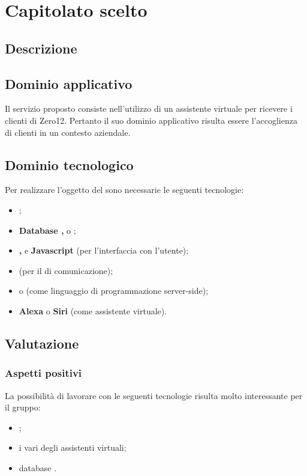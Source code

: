 \section {Capitolato scelto}
	\subsection {Descrizione}
		\SCOPO
	\subsection {Dominio applicativo}
Il servizio proposto consiste nell'utilizzo di un assistente virtuale per ricevere i clienti di Zero12. Pertanto il suo dominio applicativo risulta essere l'accoglienza di clienti in un contesto aziendale.
	\subsection {Dominio tecnologico}
		Per realizzare l'oggetto del  sono necessarie le seguenti tecnologie:
		\begin {itemize}
			\item \textbf{};
			\item \textbf{Database , } o \textbf{};
			\item \textbf{, } e \textbf{Javascript} (per l'interfaccia con l'utente);
			\item \textbf{} (per il  di comunicazione);
			\item \textbf{} o \textbf{} (come linguaggio di programmazione
 server-side);
 			\item \textbf{ Alexa} o \textbf{Siri} (come assistente virtuale).

		\end {itemize}
	\subsection {Valutazione}
		\subsubsection {Aspetti positivi}
			 La possibilità di lavorare con le seguenti tecnologie risulta molto interessante per il gruppo:
				 \begin {itemize}
				 	\item {};
				 	\item i vari  degli assistenti virtuali;
				 	\item database .
				 \end {itemize}
